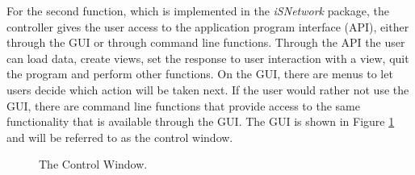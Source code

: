 \documentclass{article}[11pt]
\newcommand{\Rpackage}[1]{{\textit{#1}}}
\begin{document}
For the second function, which is implemented in the \Rpackage{iSNetwork}
package, the controller gives the user access to the application program
interface (API), either through the GUI or through command line functions.
Through the API the user can load data, create views, set the response to user
interaction with a view, quit the program and perform other functions.  On the
GUI, there are menus to let users decide which action will be taken next.  If
the user would rather not use the GUI, there are command line functions that
provide access to the same functionality that is available through the GUI.
The GUI is shown in Figure \ref{Fig:ContWin} and will be referred to as the
control window.

\begin{figure}[ht]
  \begin{center}
    \caption{ The Control Window. }
    \label{Fig:ContWin}
  \end{center}
\end{figure}
\end{document}
